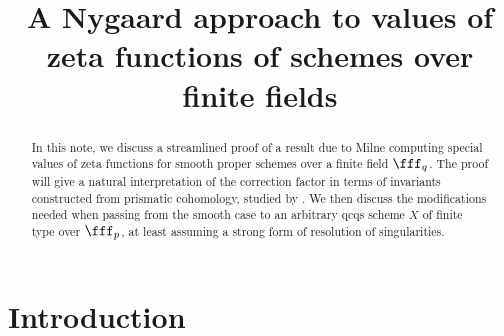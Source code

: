 
\title{
	A Nygaard approach to values of zeta functions of schemes over finite fields
}



	\DeclareDocumentCommand{}
	\DeclareDocumentCommand{}
	\DeclareDocumentCommand{}
	\DeclareDocumentCommand{}
	
	\maketitle
	\begin{abstract}
In this note, we discuss a streamlined proof of a result due to Milne \cite{MilneValues} computing special values of zeta functions for smooth proper schemes over a finite field $\fff_q$.  The proof will give a natural interpretation of the correction factor in terms of invariants constructed from prismatic cohomology, studied by \cite{morin2021topological}.  We then discuss the modifications needed when passing from the smooth case to an arbitrary qcqs scheme $X$ of finite type over $\fff_p$, at least assuming a strong form of resolution of singularities.
	\end{abstract}
{\small
	\setcounter{tocdepth}{1}
	\tableofcontents
	\vspace{3.0ex}
}
	\section{Introduction}
		\setcounter{section}{1}
		
